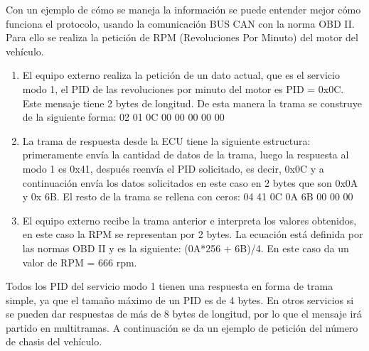 Con un ejemplo de cómo se maneja la información se puede entender mejor cómo funciona el protocolo, usando la comunicación BUS CAN con la norma OBD II. Para ello se realiza la petición de RPM (Revoluciones Por Minuto) del motor del vehículo.


\begin{enumerate}
\item El equipo externo realiza la petición de un dato actual, que es el servicio modo 1, el PID de las revoluciones por minuto del motor es PID = 0x0C. Este mensaje tiene 2 bytes de longitud. De esta manera la trama se construye de la siguiente forma:  
02 01 0C 00 00 00 00 00
\item La trama de respuesta desde la ECU tiene la siguiente estructura: primeramente envía la cantidad de datos de la trama, luego la respuesta al modo 1 es 0x41, después reenvía el PID solicitado, es decir, 0x0C y a continuación envía los datos solicitados en este caso en 2 bytes que son 0x0A y 0x 6B. El resto de la trama se rellena con ceros: 04 41 0C 0A 6B 00 00 00
\item El equipo externo recibe la trama anterior e interpreta los valores obtenidos, en este caso la RPM se representan por 2 bytes. La ecuación está definida por las  normas OBD II y es la siguiente: (0A*256 + 6B)/4. En este caso da un valor de RPM = 666 rpm. 
\end{enumerate}

Todos los PID del servicio modo 1 tienen una respuesta en forma de trama simple, ya que el tamaño máximo de un PID es de 4 bytes.
En otros servicios si se pueden dar respuestas de más de 8 bytes de longitud, por lo que el mensaje irá partido en multitramas. A continuación se da un ejemplo de petición del número de chasis del vehículo.

